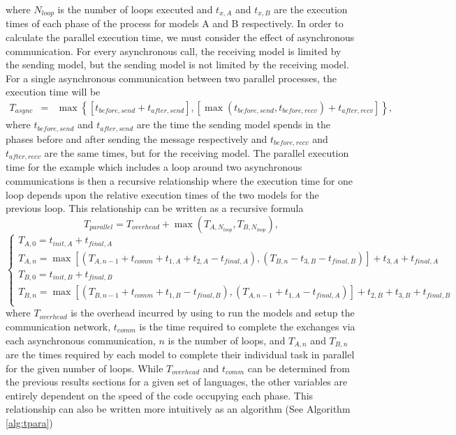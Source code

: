 \documentclass[journal]{IEEEtran}
\newcommand{\todo}[1]{{\color{red}{#1}}}
\newcommand{\pkg}{{\tt \todo{cis\_interface}}{}}
\begin{document}
%
where $N_{loop}$ is the number of loops executed and $t_{x,A}$ and $t_{x,B}$ are the execution times of each phase of the process for models A and B respectively.
%
In order to calculate the parallel execution time, we must consider the effect of asynchronous communication. For every asynchronous call, the receiving model is limited by the sending model, but the sending model is not limited by the receiving model. For a single asynchronous communication between two parallel processes, the execution time will be
%
\begin{eqnarray}
T_{async} & = & \max\left\{\left[t_{before,send} + t_{after,send}\right], \left[\max(t_{before,send}, t_{before,recv}) + t_{after,recv}\right]\right\},
\end{eqnarray}
%
where $t_{before,send}$ and $t_{after,send}$ are the time the sending model spends in the phases before and after sending the message respectively and $t_{before,recv}$ and $t_{after,recv}$ are the same times, but for the receiving model. The parallel execution time for the example which includes a loop around two asynchronous communications is then a recursive relationship where the execution time for one loop depends upon the relative execution times of the two models for the previous loop. This relationship can be written as a recursive formula
%
\begin{equation}
T_{parallel} = T_{overhead} + \max(T_{A,N_{loop}}, T_{B,N_{loop}}),
\end{equation}
\begin{equation}
\begin{cases}
T_{A, 0} = t_{init,A} + t_{final,A} \\
T_{A, n} = \max\left[(T_{A, n-1} + t_{comm} + t_{1,A} + t_{2,A} - t_{final,A}), (T_{B, n} - t_{3,B} - t_{final,B})\right] + t_{3,A} + t_{final,A}\\
T_{B, 0} = t_{init,B} + t_{final,B}\\
T_{B, n} = \max\left[(T_{B, n-1} + t_{comm} + t_{1,B} - t_{final,B}), (T_{A, n-1} + t_{1,A} - t_{final,A})\right] + t_{2,B} + t_{3,B} + t_{final,B}\\
\end{cases}
\end{equation}
%
where $T_{overhead}$ is the overhead incurred by using {\pkg} to run the models and setup the communication network, $t_{comm}$ is the time required to complete the exchanges via each {\pkg} asynchronous communication, $n$ is the number of loops, and $T_{A,n}$ and $T_{B,n}$ are the times required by each model to complete their individual task in parallel for the given number of loops. While $T_{overhead}$ and $t_{comm}$ can be determined from the previous results sections for a given set of languages, the other variables are entirely dependent on the speed of the code occupying each phase. This relationship can also be written more intuitively as an algorithm (See Algorithm \ref{alg:tpara}) 
\end{document}
